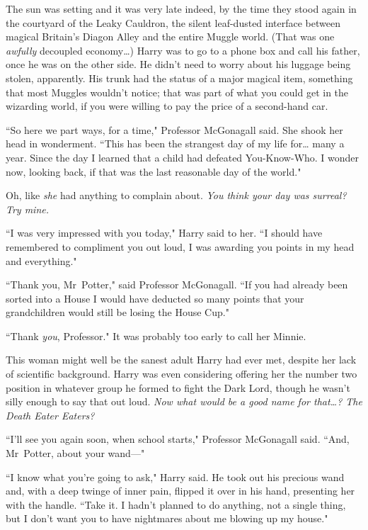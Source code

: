 \later

The sun was setting and it was very late indeed, by the time they stood again in the courtyard of the Leaky Cauldron, the silent leaf-dusted interface between magical Britain's Diagon Alley and the entire Muggle world. (That was one \emph{awfully} decoupled economy{\ldots}) Harry was to go to a phone box and call his father, once he was on the other side. He didn't need to worry about his luggage being stolen, apparently. His trunk had the status of a major magical item, something that most Muggles wouldn't notice; that was part of what you could get in the wizarding world, if you were willing to pay the price of a second-hand car.

``So here we part ways, for a time," Professor McGonagall said. She shook her head in wonderment. ``This has been the strangest day of my life for{\ldots} many a year. Since the day I learned that a child had defeated You-Know-Who. I wonder now, looking back, if that was the last reasonable day of the world."

Oh, like \emph{she} had anything to complain about. \emph{You think your day was surreal? Try mine.}

``I was very impressed with you today," Harry said to her. ``I should have remembered to compliment you out loud, I was awarding you points in my head and everything."

``Thank you, Mr~Potter," said Professor McGonagall. ``If you had already been sorted into a House I would have deducted so many points that your grandchildren would still be losing the House Cup."

``Thank \emph{you}, Professor." It was probably too early to call her Minnie.

This woman might well be the sanest adult Harry had ever met, despite her lack of scientific background. Harry was even considering offering her the number two position in whatever group he formed to fight the Dark Lord, though he wasn't silly enough to say that out loud. \emph{Now what would be a good name for that{\ldots}? The Death Eater Eaters?}

``I'll see you again soon, when school starts," Professor McGonagall said. ``And, Mr~Potter, about your wand—"

``I know what you're going to ask," Harry said. He took out his precious wand and, with a deep twinge of inner pain, flipped it over in his hand, presenting her with the handle. ``Take it. I hadn't planned to do anything, not a single thing, but I don't want you to have nightmares about me blowing up my house."

